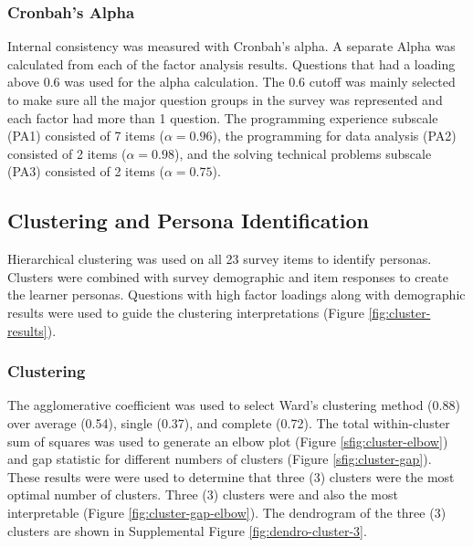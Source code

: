 \documentclass[020-persona\_validation.tex]{subfiles}
\begin{document}
    \subsubsection{Cronbah's Alpha}

        Internal consistency was measured with Cronbah's alpha.
        A separate Alpha was calculated from each of the factor analysis results.
        Questions that had a loading above $0.6$ was used for the alpha calculation.
        The $0.6$ cutoff was mainly selected to make sure all the major question groups in the survey was represented
        and each factor had more than 1 question.
        The programming experience subscale (PA1) consisted of 7 items ($\alpha = 0.96$),
        the programming for data analysis (PA2) consisted of 2 items ($\alpha = 0.98$), and
        the solving technical problems subscale (PA3) consisted of 2 items ($\alpha = 0.75$).

    \subsection{Clustering and Persona Identification}

        Hierarchical clustering was used on all 23 survey items to identify personas.
        Clusters were combined with survey demographic and item responses to create the learner personas.
        Questions with high factor loadings along with demographic results were used to guide the clustering interpretations
        (Figure \ref{fig:cluster-results}).

    \subsubsection{Clustering}

        The agglomerative coefficient was used to select Ward's clustering method (0.88) over
        average (0.54), single (0.37), and complete (0.72).
        The total within-cluster sum of squares was used to generate an elbow plot (Figure \ref{sfig:cluster-elbow})
        and gap statistic for different numbers of clusters (Figure \ref{sfig:cluster-gap}).
        These results were were used to
        determine that three (3) clusters were the most optimal number of clusters.
        Three (3) clusters were and also the most interpretable
        (Figure \ref{fig:cluster-gap-elbow}).
        The dendrogram of the three (3) clusters are shown in
        Supplemental Figure \ref{fig:dendro-cluster-3}.
\end{document}
